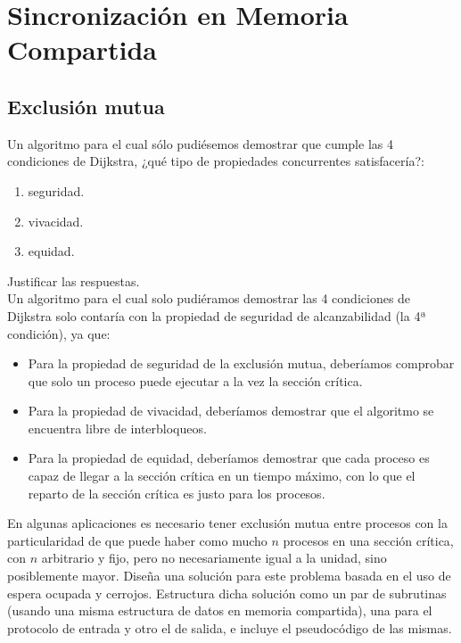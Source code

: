 \section{Sincronización en Memoria Compartida}
\subsection{Exclusión mutua}
\begin{ejercicio}
    Un algoritmo para el cual sólo pudiésemos demostrar que cumple las 4 condiciones de Dijkstra, ¿qué tipo de propiedades concurrentes satisfacería?: 
    \begin{enumerate}[label=(\alph*)]
        \item seguridad.
        \item vivacidad.
        \item equidad.
    \end{enumerate}
    Justificar las respuestas.\\

    Un algoritmo para el cual solo pudiéramos demostrar las 4 condiciones de Dijkstra solo contaría con la propiedad de seguridad de alcanzabilidad (la 4ª condición), ya que:
    \begin{itemize}
        \item Para la propiedad de seguridad de la exclusión mutua, deberíamos comprobar que solo un proceso puede ejecutar a la vez la sección crítica.
        \item Para la propiedad de vivacidad, deberíamos demostrar que el algoritmo se encuentra libre de interbloqueos.
        \item Para la propiedad de equidad, deberíamos demostrar que cada proceso es capaz de llegar a la sección crítica en un tiempo máximo, con lo que el reparto de la sección crítica es justo para los procesos.
    \end{itemize}
\end{ejercicio}

\begin{ejercicio}
    En algunas aplicaciones es necesario tener exclusión mutua entre procesos con la particularidad de que puede haber como mucho $n$ procesos en una sección crítica, con $n$ arbitrario y fijo, pero no necesariamente igual a la unidad, sino posiblemente mayor. Diseña una solución para este problema basada en el uso de espera ocupada y cerrojos. Estructura dicha solución como un par de subrutinas (usando una misma estructura de datos en memoria compartida), una para el protocolo de entrada y otro el de salida, e incluye el pseudocódigo de las mismas.
\end{ejercicio}

